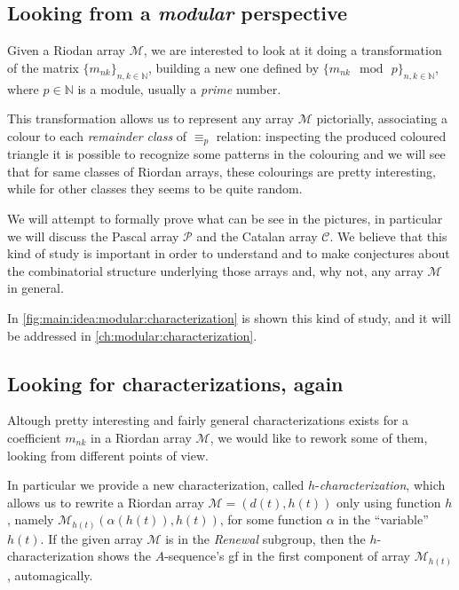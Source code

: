 

\subsection{Looking from a \emph{modular} perspective}

Given a Riodan array $\mathcal{M}$, we are interested to look at it
doing a transformation of the matrix $\lbrace m_{nk}\rbrace_{n,k\in\mathbb{N}}$,
building a new one defined by $\lbrace m_{nk}\mod\,p\rbrace_{n,k\in\mathbb{N}}$,
where $p\in\mathbb{N}$ is a module, usually a \emph{prime} number.

This transformation allows us to represent any array $\mathcal{M}$ pictorially,
associating a colour to each \emph{remainder class} of $\equiv_{p}$ relation:
inspecting the produced coloured triangle it is possible to recognize some
patterns in the colouring and we will see that for same classes of Riordan
arrays, these colourings are pretty interesting, while for other classes they
seems to be quite random.

We will attempt to formally prove what can be see in the pictures, in
particular we will discuss the Pascal array $\mathcal{P}$ and the Catalan array
$\mathcal{C}$.  We believe that this kind of study is important in order to
understand and to make conjectures about the combinatorial structure underlying
those arrays and, why not, any array $\mathcal{M}$ in general.



In \autoref{fig:main:idea:modular:characterization} is shown this kind of study,
and it will be addressed in \autoref{ch:modular:characterization}.

\subsection{Looking for characterizations, again}

Altough pretty interesting and fairly general characterizations exists for
a coefficient $m_{nk}$ in a Riordan array $\mathcal{M}$, we would like to
rework some of them, looking from different points of view.

In particular we provide a new characterization, called $h$-\emph{characterization},
which allows us to rewrite a Riordan array $\mathcal{M}=(d(t),h(t))$ only
using function $h$, namely $\mathcal{M}_{h(t)}(\alpha(h(t)),h(t))$, for some
function $\alpha$ in the ``variable'' $h(t)$. If the given array $\mathcal{M}$
is in the \emph{Renewal} subgroup, then the $h$-characterization shows the $A$-sequence's
\ac{gf} in the first component of array $\mathcal{M}_{h(t)}$, automagically.

